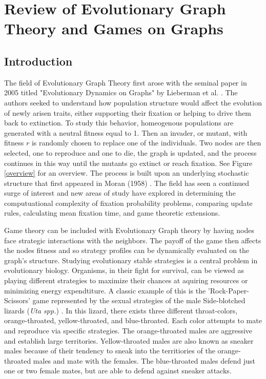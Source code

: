 \documentclass[12pt, AofM.tex]{subfiles}
\begin{document}

\section{Review of Evolutionary Graph Theory and Games on Graphs}
\subsection{Introduction}
The field of Evolutionary Graph Theory first arose with the seminal paper in 2005 titled "Evolutionary Dynamics on Graphs" by Lieberman et al. \cite{liebermanEvolutionaryDynamicsGraphs2005}. The authors seeked to understand how population structure would affect the evolution of newly arisen traits, either supporting their fixation or helping to drive them back to extinction. To study this behavior, homeogenous populations are generated with a neutral fitness equal to 1. Then an invader, or mutant, with fitness $r$ is randomly chosen to replace one of the individuals. Two nodes are then selected, one to reproduce and one to die, the graph is updated, and the process continues in this way until the mutants go extinct or reach fixation. See Figure \ref{overview} for an overview. The process is built upon an underlying stochastic structure that first appeared in Moran (1958) \cite{moranRandomProcessesGenetics1958}. The field has seen a continued surge of interest and new areas of study have explored in determining the computuational complexity of fixation probability problems, comparing update rules, calculating mean fixation time, and game theoretic extensions.

Game theory can be included with Evolutionary Graph theory by having nodes face strategic interactions with the neighbors. The payoff of the game then affects the nodes fitness and so strategy profiles can be dynamically evaluated on the graph's structure. Studying evolutionary stable strategies is a central problem in evolutionary biology. Organisms, in their fight for survival, can be viewed as playing different strategies to maximize their chances at aquiring resources or minimizing energy expendtiture. A classic example of this is the 'Rock-Paper-Scissors' game represented by the sexual strategies of the male Side-blotched lizards (\emph{Uta spp.}) \cite{sinervoRockPaperScissors1996}. In this lizard, there exists three different throat-colors, orange-throated, yellow-throated, and blue-throated. Each color attempts to mate and reproduce via specific strategies. The orange-throated males are aggressive and establish large territories. Yellow-throated males are also known as sneaker males because of their tendency to sneak into the territiories of the orange-throated males and mate with the females. The blue-throated males defend just one or two female mates, but are able to defend against sneaker attacks.
\end{document}

